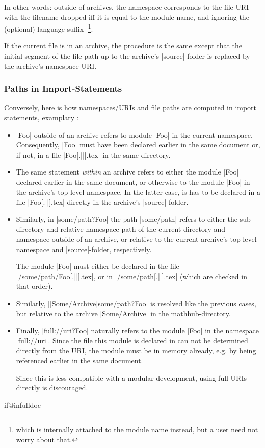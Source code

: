    In other words: outside of archives, the namespace corresponds to
   the file URI with the filename dropped iff it is equal to the
   module name, and ignoring the (optional) language suffix^^A
   \footnote{which is internally attached to the module name instead,
   but a user need not worry about that.}.

   If the current file is in an archive, the procedure is the same
   except that the initial segment of the file path up to the archive's
   |source|-folder is replaced by the archive's namespace URI.

 \subsubsection{Paths in Import-Statements}

 Conversely, here is how namespaces/URIs and file paths are computed
 in import statements, examplary :

 \begin{itemize}
   \item {}|{Foo}| outside of an archive refers 
     to module |Foo| in the current namespace. Consequently, |Foo|
     must have been declared earlier in the same document or, if not,
     in a file |Foo[.||].tex| in the same directory.
   \item The same statement \emph{within} an archive refers to either
     the module |Foo| declared earlier in the same document, or
     otherwise to the module |Foo| in the archive's top-level namespace.
     In the latter case, is has to be declared in a file |Foo[.||].tex|
     directly in the archive's |source|-folder.
   \item Similarly, in |{some/path?Foo}| the path
     |some/path| refers to either the sub-directory and relative 
     namespace path of the current directory and namespace outside of an archive,
     or relative to the current archive's top-level namespace and |source|-folder,
     respectively.

     The module |Foo| must either be declared in the file
     |/some/path/Foo[.||].tex|, or in
     |/some/path[.||].tex| (which are
     checked in that order).
   \item Similarly, |[Some/Archive]{some/path?Foo}|
     is resolved like the previous cases, but relative to the archive
     |Some/Archive| in the mathhub-directory.
   \item Finally, |{full://uri?Foo}| naturally refers to the
     module |Foo| in the namespace |full://uri|. Since the file this module
     is declared in can not be determined directly from the URI, the module
     must be in memory already, e.g. by being referenced earlier in the
     same document.

     Since this is less compatible with a modular development, using full
     URIs directly is discouraged.

 \end{itemize} 


	
	
\csname if@infulldoc\endcsname\else\fi
